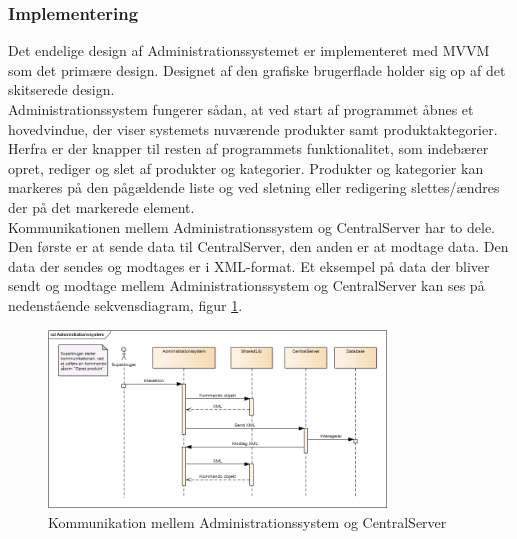 \subsubsection{Implementering}
Det endelige design af Administrationssystemet er implementeret med MVVM som det primære design. Designet af den grafiske brugerflade holder sig op af det skitserede design.\\
Administrationssystem fungerer sådan, at ved start af programmet åbnes et hovedvindue, der viser systemets nuværende produkter samt produktaktegorier. Herfra er der knapper til resten af programmets funktionalitet, som indebærer opret, rediger og slet af produkter og kategorier. Produkter og kategorier kan markeres på den pågældende liste og ved sletning eller redigering slettes/ændres der på det markerede element.\\

Kommunikationen mellem Administrationssystem og CentralServer har to dele. Den første er at sende data til CentralServer, den anden er at modtage data. Den data der sendes og modtages er i XML-format. Et eksempel på data der bliver sendt og modtage mellem Administrationssystem og CentralServer kan ses på nedenstående sekvensdiagram, figur \ref{fig:adminsekvens}.

\begin{figure}[H]
	\centering
	\includegraphics[width=0.8\textwidth]{Projektbeskrivelse/DesignOgImplementering/Images/Administrationssystem-sekvensdiagram}
	\caption{Kommunikation mellem Administrationssystem og CentralServer}
	\label{fig:adminsekvens}
\end{figure}
